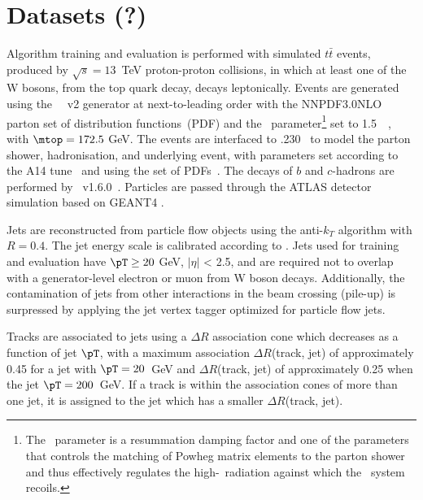 \section{Datasets (?)}
\label{sec:intro}

Algorithm training and evaluation is performed with simulated $t\bar{t}$ events, produced by $\sqrt{s} = 13$~TeV proton-proton collisions, in which at least one of the W bosons, from the top quark decay, decays leptonically. 
Events are generated using the
\powhegbox~\cite{Frixione:2007nw, Nason:2004rx, Frixione:2007vw, Alioli:2010xd}~v2
generator at next-to-leading order with the NNPDF3.0NLO~\cite{Ball:2014uwa} parton set
of distribution functions~(PDF) and the \hdamp\ parameter\footnote{The
  \hdamp\ parameter is a resummation damping factor and one of the
  parameters that controls the matching of Powheg matrix elements to
  the parton shower and thus effectively regulates the
  high-\pt\ radiation against which the \ttbar\ system recoils.} set
to 1.5~\mtop~\cite{ATL-PHYS-PUB-2016-020}, with $\mtop = 172.5$ GeV.  The events are interfaced
to \pythia.230~\cite{Sjostrand:2014zea} to model the parton shower,
hadronisation, and underlying event, with parameters set according
to the A14 tune~\cite{ATL-PHYS-PUB-2014-021} and using the \nnpdftwo
set of PDFs~\cite{Ball:2012cx}. The decays of $b$ and $c$-hadrons
are performed by \evtgen~v1.6.0~\cite{Lange:2001uf}.
Particles are passed through the ATLAS detector simulation \cite{SOFT-2010-01} based on GEANT4 \cite{Agostinelli:2002hh}.

Jets are reconstructed from particle flow objects \cite{PERF-2015-09} using the anti-$k_T$ algorithm \cite{Cacciari:2008gp} with $R=0.4$. 
The jet energy scale is calibrated according to \cite{PERF-2016-04}.
Jets used for training and evaluation have $\pT \geq 20$ GeV, $|\eta|$ < 2.5, and are required not to overlap with a generator-level electron or muon from W boson decays. 
Additionally, the contamination of jets from other interactions in the beam crossing (pile-up) is surpressed by applying the jet vertex tagger \cite{ATLAS-CONF-2014-018} optimized for particle flow jets. 

Tracks are associated to jets using a $\Delta R$ association cone which decreases as a function of jet $\pT$, with a maximum association $\Delta R$(track, jet) of approximately 0.45 for a jet with $\pT = 20$~GeV and $\Delta R$(track, jet) of approximately 0.25 when the jet $\pT = 200$~GeV. 
If a track is within the association cones of more than one jet, it is assigned to the jet which has a smaller $\Delta R$(track, jet).

